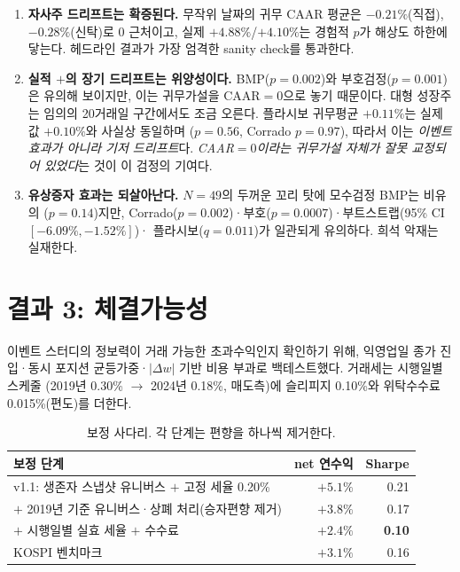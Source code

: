 \documentclass[11pt,a4paper]{article}
\newcommand{\sig}[1]{\textbf{#1}}
\begin{document}
\begin{enumerate}
\item \sig{자사주 드리프트는 확증된다.} 무작위 날짜의 귀무 CAAR 평균은 $-0.21\%$(직접),
$-0.28\%$(신탁)로 0 근처이고, 실제 $+4.88\%$/$+4.10\%$는 경험적 $p$가 해상도 하한에 닿는다.
헤드라인 결과가 가장 엄격한 sanity check를 통과한다.

\item \sig{실적 $+$의 장기 드리프트는 위양성이다.} BMP($p=0.002$)와 부호검정($p=0.001$)은
유의해 보이지만, 이는 귀무가설을 CAAR${}=0$으로 놓기 때문이다. 대형 성장주는 임의의 20거래일
구간에서도 조금 오른다. 플라시보 귀무평균 $+0.11\%$는 실제값 $+0.10\%$와 사실상 동일하며
($p=0.56$, Corrado $p=0.97$), 따라서 이는 \emph{이벤트 효과가 아니라 기저 드리프트}다.
\emph{CAAR${}=0$이라는 귀무가설 자체가 잘못 교정되어 있었다}는 것이 이 검정의 기여다.

\item \sig{유상증자 효과는 되살아난다.} $N=49$의 두꺼운 꼬리 탓에 모수검정 BMP는 비유의
($p=0.14$)지만, Corrado($p=0.002$)·부호($p=0.0007$)·부트스트랩(95\% CI $[-6.09\%, -1.52\%]$)·
플라시보($q=0.011$)가 일관되게 유의하다. 희석 악재는 실재한다.
\end{enumerate}

\section{결과 3: 체결가능성}

이벤트 스터디의 정보력이 거래 가능한 초과수익인지 확인하기 위해, 익영업일 종가 진입·동시
포지션 균등가중·$|\Delta w|$ 기반 비용 부과로 백테스트했다. 거래세는 시행일별 스케줄
(2019년 0.30\% $\to$ 2024년 0.18\%, 매도측)에 슬리피지 0.10\%와 위탁수수료 0.015\%(편도)를 더한다.

\begin{table}[htbp]
\centering
\caption{보정 사다리. 각 단계는 편향을 하나씩 제거한다.}
\small
\begin{tabular}{lrr}
\toprule
보정 단계 & net 연수익 & Sharpe \\
\midrule
v1.1: 생존자 스냅샷 유니버스 $+$ 고정 세율 0.20\% & $+5.1\%$ & 0.21 \\
$+$ 2019년 기준 유니버스·상폐 처리(승자편향 제거) & $+3.8\%$ & 0.17 \\
$+$ 시행일별 실효 세율 $+$ 수수료 & \sig{$+2.4\%$} & \sig{0.10} \\
\midrule
KOSPI 벤치마크 & $+3.1\%$ & 0.16 \\
\bottomrule
\end{tabular}
\end{table}
\end{document}
